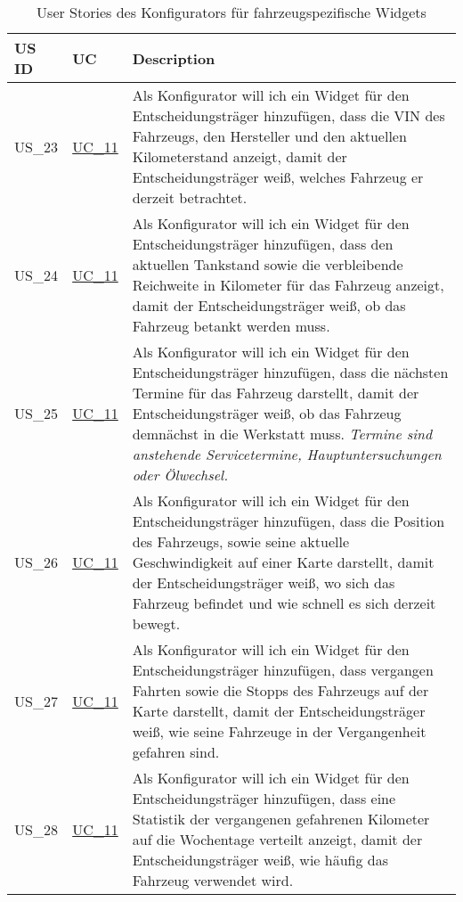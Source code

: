   \sffamily
  \begin{footnotesize}
    \label{FahrzeugWidgets}
    \begin{longtable}[L L L]{ p{} p{} p{} }
      \caption                       %
          {User Stories des Konfigurators für fahrzeugspezifische Widgets} %
          \\
      \toprule
      \textbf{US ID} & \textbf{UC} & \textbf{Description} \\
      \midrule
      \hypertarget{Ref:US23}{US\_23} & \hyperlink{Ref:UC11}{UC\_11} & Als Konfigurator will ich ein Widget für den Entscheidungsträger hinzufügen, dass die VIN des Fahrzeugs, den Hersteller und den aktuellen Kilometerstand anzeigt, damit der Entscheidungsträger weiß, welches Fahrzeug er derzeit betrachtet. \\
      \hypertarget{Ref:US24}{US\_24} & \hyperlink{Ref:UC11}{UC\_11} & Als Konfigurator will ich ein Widget für den Entscheidungsträger hinzufügen, dass den aktuellen Tankstand sowie die verbleibende Reichweite in Kilometer für das Fahrzeug anzeigt, damit der Entscheidungsträger weiß, ob das Fahrzeug betankt werden muss. \\
      \hypertarget{Ref:US25}{US\_25} & \hyperlink{Ref:UC11}{UC\_11} & Als Konfigurator will ich ein Widget für den Entscheidungsträger hinzufügen, dass die nächsten Termine für das Fahrzeug darstellt, damit der Entscheidungsträger weiß, ob das Fahrzeug demnächst in die Werkstatt muss. 
      \newline\newline
      \emph{Termine sind anstehende Servicetermine, Hauptuntersuchungen oder Ölwechsel.} \\
      \hypertarget{Ref:US26}{US\_26} & \hyperlink{Ref:UC11}{UC\_11} & Als Konfigurator will ich ein Widget für den Entscheidungsträger hinzufügen, dass die Position des Fahrzeugs, sowie seine aktuelle Geschwindigkeit auf einer Karte darstellt, damit der Entscheidungsträger weiß, wo sich das Fahrzeug befindet und wie schnell es sich derzeit bewegt. \\
      \hypertarget{Ref:US27}{US\_27} & \hyperlink{Ref:UC11}{UC\_11} & Als Konfigurator will ich ein Widget für den Entscheidungsträger hinzufügen, dass vergangen Fahrten sowie die Stopps des Fahrzeugs auf der Karte darstellt, damit der Entscheidungsträger weiß, wie seine Fahrzeuge in der Vergangenheit gefahren sind. \\
      \hypertarget{Ref:US28}{US\_28} & \hyperlink{Ref:UC11}{UC\_11} & Als Konfigurator will ich ein Widget für den Entscheidungsträger hinzufügen, dass eine Statistik der vergangenen gefahrenen Kilometer auf die Wochentage verteilt anzeigt, damit der Entscheidungsträger weiß, wie häufig das Fahrzeug verwendet wird. \\

\end{longtable}
\end{footnotesize}
